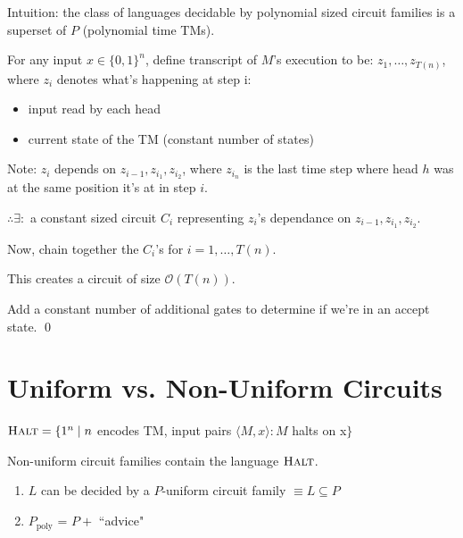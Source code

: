\documentclass[11pt]{article} %
\begin{document}
Intuition: the class of languages decidable by polynomial sized circuit families is a superset of $P$ (polynomial time TMs).



 For any input $x \in \{0,1\}^n$, define transcript of $M$'s execution to be: $z_1, \ldots, z_{T(n)}$, where $z_i$ denotes what's happening at step i:
\begin{itemize}
\item input read by each head
\item current state of the TM (constant number of states)
\end{itemize}

Note: $z_i$ depends on $z_{i-1}, z_{i_1}, z_{i_2}$, where $z_{i_n}$ is the last time step where head $h$ was at the same position it's at in step $i$.

$\therefore \exists : $ a constant sized circuit $C_i$ representing $z_i$'s dependance on $z_{i-1}, z_{i_1}, z_{i_2}$.

Now, chain together the $C_i$'s for $i=1,\ldots,T(n)$.

This creates a circuit of size $\mathcal{O}(T(n))$.

Add a constant number of additional gates to determine if we're in an accept state. \qed

\section{Uniform vs. Non-Uniform Circuits}

$\textsc{Halt} = \{1^n \mid n$ encodes TM, input pairs $\langle M, x  \rangle : M$ halts on x$ \}$

Non-uniform circuit families contain the language $\textsc{Halt}$.


\begin{enumerate}
\item $L$ can be decided by a $P$-uniform circuit family $\equiv L \subseteq P$
\item $P_{\text{poly}}$ = $P + $ ``advice"
\end{enumerate}
\end{document}
